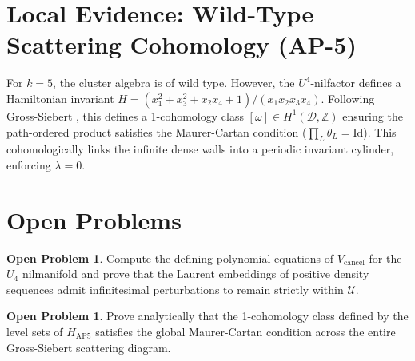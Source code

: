 \documentclass[11pt, a4paper, reqno]{amsart}
\theoremstyle{definition}
\newtheorem{problem}[theorem]{Open Problem}
\newcommand{\Z}{\mathbb{Z}}
\newcommand{\Vcancel}{V_{\mathrm{cancel}}}
\begin{document}
\section{Local Evidence: Wild-Type Scattering Cohomology (AP-5)}
For $k=5$, the cluster algebra is of wild type. However, the $U^4$-nilfactor defines a Hamiltonian invariant $H = (x_1^2 + x_3^2 + x_2 x_4 + 1)/(x_1 x_2 x_3 x_4)$. Following Gross-Siebert \cite[Theorem 1.4]{GrossSiebert2011}, this defines a 1-cohomology class $[\omega] \in H^1(\mathcal{D}, \Z)$ ensuring the path-ordered product satisfies the Maurer-Cartan condition ($\prod_L \theta_L = \mathrm{Id}$). This cohomologically links the infinite dense walls into a periodic invariant cylinder, enforcing $\lambda = 0$.

\section{Open Problems}
\begin{problem}
Compute the defining polynomial equations of $\Vcancel$ for the $U_4$ nilmanifold and prove that the Laurent embeddings of positive density sequences admit infinitesimal perturbations to remain strictly within $\mathcal{U}$.
\end{problem}
\begin{problem}
Prove analytically that the 1-cohomology class defined by the level sets of $H_{\mathrm{AP5}}$ satisfies the global Maurer-Cartan condition across the entire Gross-Siebert scattering diagram.
\end{problem}



\end{document}
